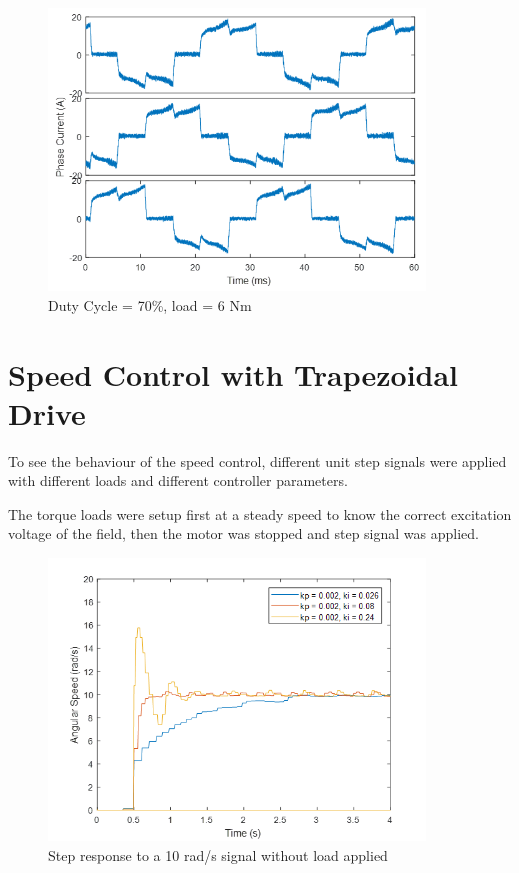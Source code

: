 \begin{figure}[h!p]
\centering
\includegraphics[width=10cm]{Images/waveforms/trap_curr_9.png} 
\caption[trapc9]{Duty Cycle = 70\%, load = 6 Nm}
\label{fig:trapc9}
\end{figure}

\clearpage
\section{Speed Control with Trapezoidal Drive}

To see the behaviour of the speed control, different unit step signals were applied with different loads and different controller parameters. 

The torque loads were setup first at a steady speed to know the correct excitation voltage of the field, then the motor was stopped and step signal was applied.

\begin{figure}[h!p]
\centering
\includegraphics[width=10cm]{Images/plots/plot_2.png} 
\caption[plot2]{Step response to a 10 rad/s signal without load applied}
\label{fig:plot2}
\end{figure}

